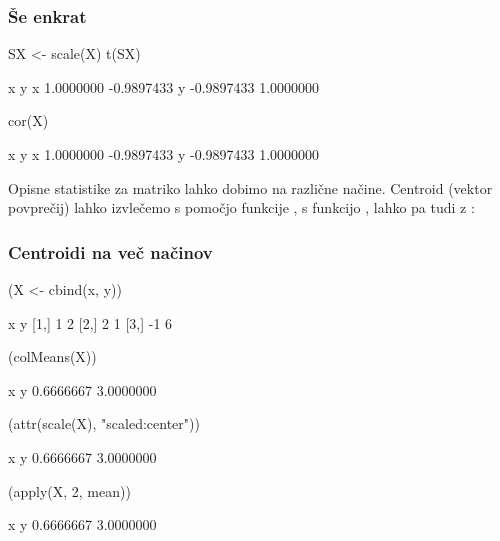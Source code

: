 \begin{frame}[fragile]
\frametitle{Še enkrat}
\begin{Schunk}
\begin{Sinput}
 SX <- scale(X)
 t(SX) %*% SX/(n - 1)
\end{Sinput}
\begin{Soutput}
           x          y
x  1.0000000 -0.9897433
y -0.9897433  1.0000000
\end{Soutput}
\begin{Sinput}
 cor(X)
\end{Sinput}
\begin{Soutput}
           x          y
x  1.0000000 -0.9897433
y -0.9897433  1.0000000
\end{Soutput}
\end{Schunk}
\end{frame}



Opisne statistike za matriko lahko dobimo na različne načine.
Centroid (vektor povprečij) lahko izvlečemo s pomočjo funkcije
, s funkcijo , lahko pa tudi z
:

\begin{frame}[fragile]
\frametitle{Centroidi na več načinov}
\begin{Schunk}
\begin{Sinput}
 (X <- cbind(x, y))
\end{Sinput}
\begin{Soutput}
      x y
[1,]  1 2
[2,]  2 1
[3,] -1 6
\end{Soutput}
\begin{Sinput}
 (colMeans(X))
\end{Sinput}
\begin{Soutput}
        x         y 
0.6666667 3.0000000 
\end{Soutput}
\begin{Sinput}
 (attr(scale(X), "scaled:center"))
\end{Sinput}
\begin{Soutput}
        x         y 
0.6666667 3.0000000 
\end{Soutput}
\begin{Sinput}
 (apply(X, 2, mean))
\end{Sinput}
\begin{Soutput}
        x         y 
0.6666667 3.0000000 
\end{Soutput}
\end{Schunk}
\end{frame}


